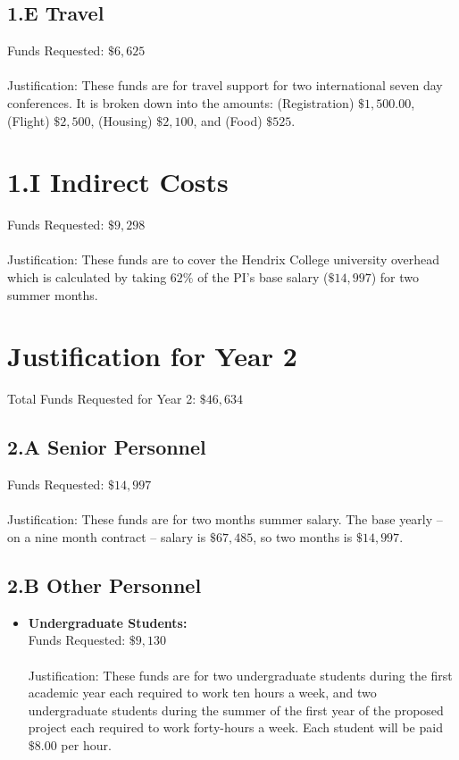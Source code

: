 \documentclass[11pt]{article}
\begin{document}
\subsection*{1.E Travel}
\label{subsec:travel}
Funds Requested: $\$6,625$\\ \ \\ Justification: These funds are for
travel support for two international seven day conferences. It is
broken down into the amounts: (Registration) $\$1,500.00$, (Flight)
$\$2,500$, (Housing) $\$2,100$, and (Food) $\$525$.

\section*{1.I Indirect Costs}
\label{sec:1.i_indirect_costs}
Funds Requested: $\$9,298$\\ \ \\ Justification: These funds are to
cover the Hendrix College university overhead which is calculated by
taking $62\%$ of the PI's base salary ($\$14,997$) for two summer
months.

\section{Justification for Year 2}
\label{sec:justification_for_year_2}
Total Funds Requested for Year 2: $\$46,634$\\
\vspace{-20px}
\subsection*{2.A Senior Personnel}
\label{subsec:a_senior_personnel}

Funds Requested: $\$14,997$\\ \ \\ Justification: These funds are for
two months summer salary. The base yearly -- on a nine month contract
-- salary is $\$67,485$, so two months is $\$14,997$.  

\subsection*{2.B Other Personnel}
\label{subsec:personnel}
\begin{itemize}

\item \textbf{Undergraduate Students:}\\ Funds Requested:
  $\$9,130$\\ \ \\ Justification: These funds are for two
  undergraduate students during the first academic year each required
  to work ten hours a week, and two undergraduate students during the
  summer of the first year of the proposed project each required to
  work forty-hours a week.  Each student will be paid $\$8.00$ per
  hour.
\end{itemize}
\end{document}
